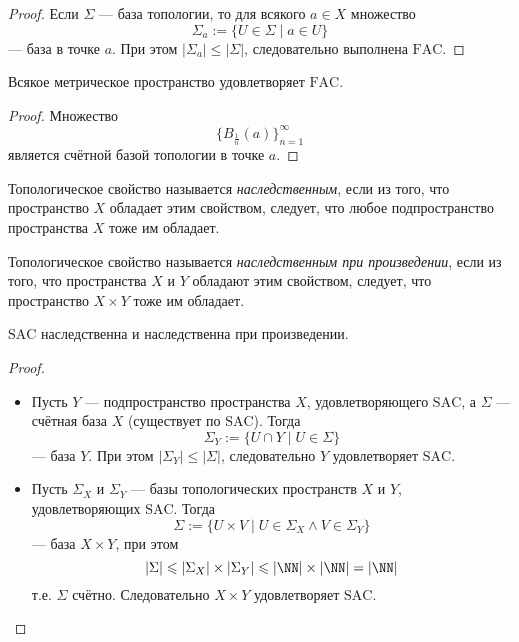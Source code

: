 \documentclass[12pt,a4paper]{article}
\newcommand{\FAC}{\ensuremath{\mathrm{FAC}}\xspace}
\newcommand{\SAC}{\ensuremath{\mathrm{SAC}}\xspace}
\begin{document}
    \begin{proof}
        Если $\Sigma$ --- база топологии, то для всякого $a \in X$ множество
        \[\Sigma_a := \{U \in \Sigma \mid a \in U\}\]
        --- база в точке $a$. При этом $|\Sigma_a| \leqslant |\Sigma|$, следовательно выполнена $\FAC$.
    \end{proof}

    \begin{theorem}
        Всякое метрическое пространство удовлетворяет $\FAC$.
    \end{theorem}

    \begin{proof}
        Множество
        \[\{B_{\frac{1}{n}}(a)\}_{n=1}^\infty\]
        является счётной базой топологии в точке $a$.
    \end{proof}

    \begin{definition}
        Топологическое свойство называется \emph{наследственным}, если из того, что пространство $X$ обладает этим свойством, следует, что любое подпространство пространства $X$ тоже им обладает.

        Топологическое свойство называется \emph{наследственным при произведении}, если из того, что пространства $X$ и $Y$ обладают этим свойством, следует, что пространство $X \times Y$ тоже им обладает.
    \end{definition}

    \begin{theorem}
        $\SAC$ наследственна и наследственна при произведении.
    \end{theorem}

    \begin{proof}
        \begin{itemize}
            \item Пусть $Y$ --- подпространство пространства $X$, удовлетворяющего $\SAC$, а $\Sigma$ --- счётная база $X$ (существует по $\SAC$). Тогда
                \[\Sigma_Y := \{U \cap Y\mid U \in \Sigma\}\]
                --- база $Y$. При этом $|\Sigma_Y| \leqslant |\Sigma|$, следовательно $Y$ удовлетворяет $\SAC$.
            \item Пусть $\Sigma_X$ и $\Sigma_Y$ --- базы топологических пространств $X$ и $Y$, удовлетворяющих $\SAC$. Тогда
                \[\Sigma := \{U \times V \mid U \in \Sigma_X \wedge V \in \Sigma_Y\}\]
                --- база $X \times Y$, при этом
                \[|\Sigma| \leqslant |\Sigma_X| \times |\Sigma_Y| \leqslant |\NN| \times |\NN| = |\NN|\]
                т.е. $\Sigma$ счётно. Следовательно $X \times Y$ удовлетворяет $\SAC$.
        \end{itemize}
    \end{proof}
\end{document}
